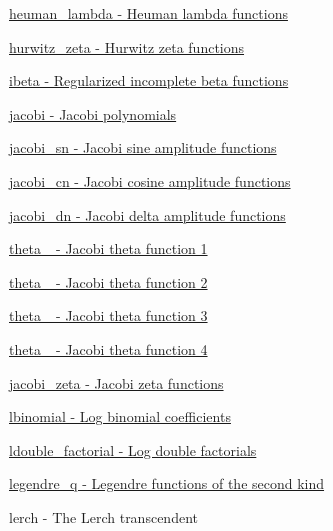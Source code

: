 \begin{DoxyItemize}
\item \hyperlink{group__gnu__math__spec__func_ga7537f96eedc8571ed1987481b2863e89}{heuman\+\_\+lambda -\/ Heuman lambda functions}
\item \hyperlink{group__gnu__math__spec__func_ga7b167ce1c8d9aa6aad40fc83a95733bd}{hurwitz\+\_\+zeta -\/ Hurwitz zeta functions}
\item \hyperlink{group__gnu__math__spec__func_ga1fa9e260ba85fc043e3d2ada99c0143c}{ibeta -\/ Regularized incomplete beta functions}
\item \hyperlink{group__gnu__math__spec__func_gad54f6601748324d268532138eb38ca33}{jacobi -\/ Jacobi polynomials}
\item \hyperlink{group__gnu__math__spec__func_ga49d5e18152dd0dd0f496b8c8582e7045}{jacobi\+\_\+sn -\/ Jacobi sine amplitude functions}
\item \hyperlink{group__gnu__math__spec__func_ga2e1c43b232d378164bed1433041ca7dc}{jacobi\+\_\+cn -\/ Jacobi cosine amplitude functions}
\item \hyperlink{group__gnu__math__spec__func_ga0f8fa8d6a77dbc2089d65f3f16876aa9}{jacobi\+\_\+dn -\/ Jacobi delta amplitude functions}
\item \hyperlink{group__gnu__math__spec__func_ga996ca8c1fff75e2d4f196e99e0919933}{theta\+\_ -\/ Jacobi theta function 1}
\item \hyperlink{group__gnu__math__spec__func_gaf6b13dac1f112a870299d75cb4cf42cc}{theta\+\_ -\/ Jacobi theta function 2}
\item \hyperlink{group__gnu__math__spec__func_gaf4eac2990db1dadba66ae688ceaa6403}{theta\+\_ -\/ Jacobi theta function 3}
\item \hyperlink{group__gnu__math__spec__func_ga676501b6284d5702a3dc61252e6c78ab}{theta\+\_ -\/ Jacobi theta function 4}
\item \hyperlink{group__gnu__math__spec__func_ga639be4ebef9a20572375ec534be52b07}{jacobi\+\_\+zeta -\/ Jacobi zeta functions}
\item \hyperlink{group__gnu__math__spec__func_gabfa5aeba56edfa110846fc8e76963bc2}{lbinomial -\/ Log binomial coefficients}
\item \hyperlink{group__gnu__math__spec__func_ga43bf9a20282d5b9237bf352682a48395}{ldouble\+\_\+factorial -\/ Log double factorials}
\item \hyperlink{group__gnu__math__spec__func_gadad5b22d0075dca31690907668af568f}{legendre\+\_\+q -\/ Legendre functions of the second kind}
\item lerch -\/ The Lerch transcendent

\end{DoxyItemize}
